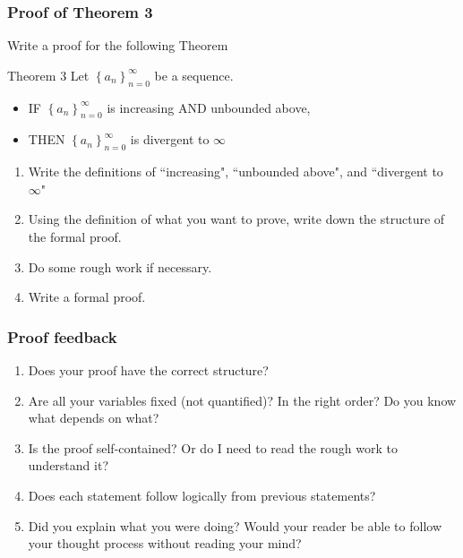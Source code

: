 \begin{frame}[t]
	\fontsize{13}{13}\selectfont
	\frametitle{Proof of Theorem 3}
	Write a proof for the following Theorem
	\begin{block}{\fontsize{13}{13}\selectfont Theorem 3}
		Let $\displaystyle \left\{ a_{n} \right\}_{n=0}^{\infty}$ be a sequence.
		\begin{itemize}
			\item IF $\displaystyle \left\{ a_{n} \right\}_{n=0}^{\infty}$ is increasing
				AND unbounded above,

			\item THEN $\displaystyle \left\{ a_{n} \right\}_{n=0}^{\infty}$ is divergent
				to $\infty$
		\end{itemize}
	\end{block}
	\begin{enumerate}
		\item Write the definitions of ``increasing", ``unbounded above", and ``divergent
			to $\infty$"

		\item Using the definition of what you want to prove, write down the
			structure of the formal proof.

		\item Do some rough work if necessary.

		\item Write a formal proof.
	\end{enumerate}
\end{frame}

\begin{frame}[t]
	\frametitle{Proof feedback}

	\begin{enumerate}
		\item Does your proof have the correct structure?

		\item Are all your variables fixed (not quantified)? In the right order? Do you
			know what depends on what?

		\item Is the proof self-contained? Or do I need to read the rough work to
			understand it?

		\item Does each statement follow logically from previous statements?

		\item Did you explain what you were doing? Would your reader be able to
			follow your thought process without reading your mind?
	\end{enumerate}
\end{frame}


